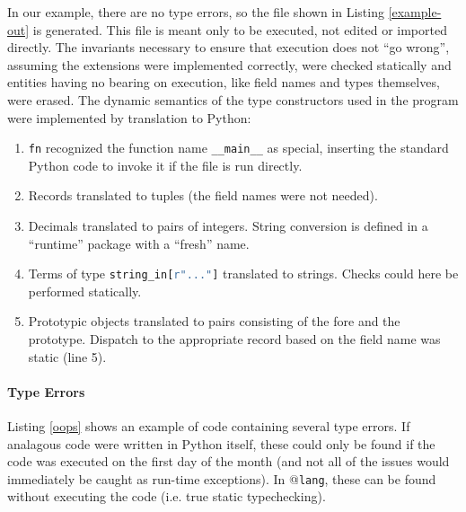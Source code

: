 \documentclass[9pt,preprint]{sigplanconf}
\newcommand{\lstinlinep}[1]{\lstinline[language=Python,basicstyle=\ttfamily\small]{#1}}
\begin{document}
In our example, there are no type errors, so the file shown in Listing \ref{example-out}  is generated. This file is meant only to be executed, not edited or imported directly. The invariants necessary to ensure that execution does not ``go wrong'', assuming the extensions were implemented correctly, were checked statically and entities having no bearing on execution, like field names and types themselves, were erased. The dynamic semantics of the type constructors used in the program were implemented by translation to Python:%
\begin{enumerate}
\item \lstinlinep{fn} recognized the function name \lstinlinep{__main__} as special, inserting the standard Python code to invoke it if the file is run directly.
\item Records translated to tuples (the field names were not needed).
\item Decimals translated to pairs of integers. String conversion is defined in a ``runtime'' package with a ``fresh'' name.
\item Terms of type \lstinlinep{string_in[r"..."]} translated to strings. Checks could here be performed  statically.%
\item Prototypic objects translated to pairs consisting of the fore and the prototype. Dispatch to the appropriate record based on the field name was static (line 5).
\end{enumerate}


\paragraph{Type Errors} Listing \ref{oops} shows an example of code containing several type errors. If analagous code were written in Python itself, these could only be found if the code was executed on the first day of the month (and not all of the issues would  immediately be caught as run-time exceptions). In @\texttt{lang}, these can be found without executing the code (i.e. true static typechecking).
\end{document}
